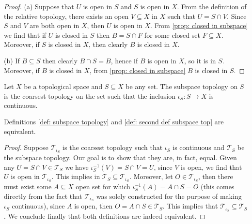 \begin{proof}
  (a) Suppose that \(U\) is open in \(S\) and \(S\) is open in \(X\). From the
  definition of the relative topology, there exists an open \(V \subseteq X\) in
  \(X\) such that \(U = S \cap V\). Since \(S\) and \(V\) are both open in
  \(X\), then \(U\) is open in \(X\). From \cref{prop: closed in subspace} we
  find that if \(U\) is closed in \(S\) then \(B = S \cap F\) for some closed
  set \(F \subseteq X\). Moreover, if \(S\) is closed in \(X\), then clearly
  \(B\) is closed in \(X\).

  (b) If \(B \subseteq S\) then clearly \(B \cap S = B\), hence if \(B\) is open
  in \(X\), so it is in \(S\). Moreover, if \(B\) is closed in \(X\), from
  \cref{prop: closed in subspace} \(B\) is closed in \(S\).
\end{proof}

\begin{definition}
  \label{def: second def subspace top}
  Let \(X\) be a topological space and \(S \subseteq X\) be any set. The
  subspace topology on \(S\) is the coarsest topology on the set such that the
  inclusion \(\iota_S: S \to X\) is continuous.
\end{definition}

\begin{corollary}
  Definitions \ref{def: subspace topology} and \ref{def: second def subspace
  top} are equivalent.
\end{corollary}

\begin{proof}
  Suppose \(\mathcal T_{\iota_S}\) is the coarsest topology such that
  \(\iota_S\) is continuous and \(\mathcal T_S\) be the subspace topology. Our
  goal is to show that they are, in fact, equal. Given any \(U = S \cap V \in
  \mathcal T_S\) we have \(\iota_S^{-1}(V) = S \cap V = U\), since \(V\) is
  open, we find that \(U\) is open in \(\mathcal T_{\iota_S}\). This implies in
  \(\mathcal T_S \subseteq \mathcal T_{\iota_S}\). Moreover, let \(O \in
  \mathcal T_{\iota_S}\), then there must exist some \(A \subseteq X\) open set
  for which \(\iota_S^{-1}(A) = A \cap S = O\) (this comes directly from the
  fact that \(\mathcal T_{\iota_S}\) was solely constructed for the purpose of
  making \(\iota_S\) continuous), since \(A\) is open, then \(O = A \cap S \in
  \mathcal T_S\). This implies that \(\mathcal T_{\iota_S} \subseteq \mathcal
  T_S\). We conclude finally that both definitions are indeed equivalent.
\end{proof}


